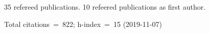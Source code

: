 35 refereed publications. 10 refeered publications as first author.

Total citations~=~822; h-index~=~15 (2019-11-07)